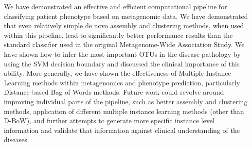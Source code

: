 
We have demonstrated an effective and efficient computational pipeline for classifying patient phenotype based on metagenomic data. We have demonstrated that even relatively simple de novo assembly and clustering methods, when used within this pipeline, lead to significantly better performance results than the standard classifier used in the original Metagenome-Wide Association Study. We have shown how to infer the most important OTUs in the disease pathology by using the SVM decision boundary and discussed the clinical importance of this ability. More generally, we have shown the effectiveness of Multiple Instance Learning methods within metagenomics and phenotype prediction, particularly Distance-based Bag of Words methods. Future work could revolve around improving individual parts of the pipeline, such as better assembly and clustering methods, application of different multiple instance learning methods (other than D-BoW), and further attempts to generate more specific instance level information and validate that information against clinical understanding of the diseases.